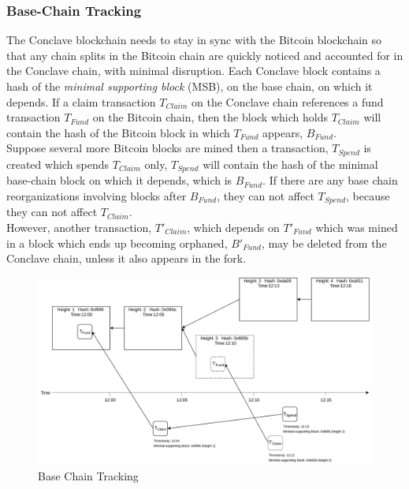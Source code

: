 \documentclass{report}
\begin{document}
			\subsubsection{Base-Chain Tracking}
			The Conclave blockchain needs to stay in sync with the Bitcoin blockchain so that any chain splits in the Bitcoin chain are quickly noticed and accounted for in the Conclave chain, with minimal disruption. Each Conclave block contains a hash of the \textit{minimal supporting block} (MSB), on the base chain, on which it depends. If a claim transaction $T_{Claim}$ on  the Conclave chain references a fund transaction $T_{Fund}$ on  the Bitcoin chain, then the block which holds $T_{Claim}$ will contain the hash of the Bitcoin block in which $T_{Fund}$ appears, $B_{Fund}$. \\
			
			Suppose several more Bitcoin blocks are mined then a transaction, $T_{Spend}$ is created which spends $T_{Claim}$ only, $T_{Spend}$ will contain the hash of the minimal base-chain block on which it depends, which is $B_{Fund}$. If there are any base chain reorganizations involving blocks after $B_{Fund}$, they can not affect $T_{Spend}$, because they can not affect $T_{Claim}$. \\
			
			However, another transaction, $T'_{Claim}$, which depends on $T'_{Fund}$ which was mined in a block which ends up becoming orphaned, $B'_{Fund}$, may be deleted from the Conclave chain, unless it also appears in the fork.
			
			
			\begin{figure}[H]
				\begin{center}
					\includegraphics[width=350pt]{img/base-chain-tracking.png}
				\end{center}
				\caption{Base Chain Tracking}
				\label{fig:baseChainTracking}
			\end{figure}
			
\end{document}
